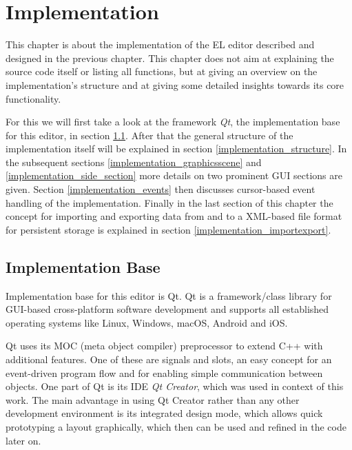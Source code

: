 \documentclass[twoside, openright, 12pt]{book}
\begin{document}
\cleardoublepage
\chapter{Implementation}
\label{implementation}
This chapter is about the implementation of the EL editor described and designed in the previous chapter.
This chapter does not aim at explaining the source code itself or listing all functions, but at giving an overview on the implementation's structure and at giving some detailed insights towards its core functionality.

For this we will first take a look at the framework \textit{Qt}, the implementation base for this editor, in section \ref{implementation_base}.
After that the general structure of the implementation itself will be explained in section \ref{implementation_structure}.
In the subsequent sections \ref{implementation_graphicsscene} and \ref{implementation_side_section} more details on two prominent GUI sections are given.
Section \ref{implementation_events} then discusses cursor-based event handling of the implementation.
Finally in the last section of this chapter the concept for importing and exporting data from and to a XML-based file format for persistent storage is explained in section \ref{implementation_importexport}.



\section{Implementation Base}
\label{implementation_base}
Implementation base for this editor is Qt.
Qt is a framework/class library for GUI-based cross-platform software development and supports all established operating systems like Linux, Windows, macOS, Android and iOS.

Qt uses its MOC (meta object compiler) preprocessor to extend C++ with additional features.
One of these are signals and slots, an easy concept for an event-driven program flow and for enabling simple communication between objects.
One part of Qt is its IDE \textit{Qt Creator}, which was used in context of this work.
The main advantage in using Qt Creator rather than any other development environment is its integrated design mode, which allows quick prototyping a layout graphically, which then can be used and refined in the code later on.
\end{document}
